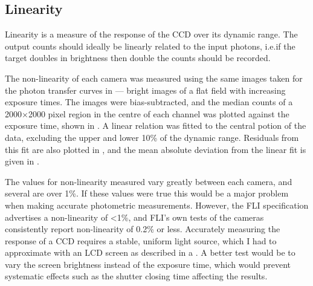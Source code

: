 \subsection{Linearity}
\label{sec:lin}
\begin{colsection}

Linearity is a measure of the response of the CCD over its dynamic range. The output counts should ideally be linearly related to the input photons, i.e.\@ if the target doubles in brightness then double the counts should be recorded.

The non-linearity of each camera was measured using the same images taken for the photon transfer curves in  --- bright images of a flat field with increasing exposure times. The images were bias-subtracted, and the median counts of a 2000$\times$2000 pixel region in the centre of each channel was plotted against the exposure time, shown in . A linear relation was fitted to the central potion of the data, excluding the upper and lower 10\% of the dynamic range. Residuals from this fit are also plotted in , and the mean absolute deviation from the linear fit is given in .

The values for non-linearity measured vary greatly between each camera, and several are over 1\%. If these values were true this would be a major problem when making accurate photometric measurements. However, the FLI specification advertises a non-linearity of <1\%, and FLI's own tests of the cameras consistently report non-linearity of 0.2\% or less. Accurately measuring the response of a CCD requires a stable, uniform light source, which I had to approximate with an LCD screen as described in a . A better test would be to vary the screen brightness instead of the exposure time, which would prevent systematic effects such as the shutter closing time affecting the results.


\end{colsection}
